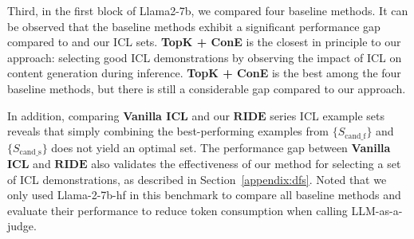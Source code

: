 Third, in the first block of Llama2-7b, we compared four baseline methods.
It can be observed that the baseline methods exhibit a significant performance gap compared to \methodname{} and our ICL sets. 
\textbf{TopK + ConE} is the closest in principle to our approach: selecting good ICL demonstrations by observing the impact of ICL on content generation during inference. 
\textbf{TopK + ConE} is the best among the four baseline methods, but there is still a considerable gap compared to our approach. 

In addition, comparing \textbf{Vanilla ICL} and our $\textbf{RIDE}$ series ICL example sets reveals that simply combining the best-performing examples from $\{S_\text{cand\_f}\}$ and $\{S_\text{cand\_s}\}$ does not yield an optimal set. 
The performance gap between \textbf{Vanilla ICL} and $\textbf{RIDE}$ also validates the effectiveness of our method for selecting a set of ICL demonstrations, as described in Section~\ref{appendix:dfs}.
Noted that we only used Llama-2-7b-hf in this benchmark to compare all baseline methods and evaluate their performance to reduce token consumption when calling LLM-as-a-judge.



